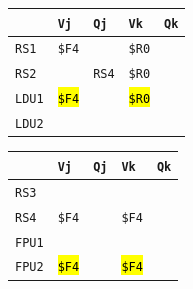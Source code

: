 \begin{enumerate}
    \begin{minipage}{0.45\textwidth}
        \centering
        \begin{tabular}{@{} l | l l l l @{}}
            \toprule
                & \texttt{Vj} & \texttt{Qj} & \texttt{Vk} & \texttt{Qk} \\
            \midrule
            \texttt{RS1} & \texttt{\$F4} & & \texttt{\$R0} & \\ [.3em]
            \texttt{RS2} & & \texttt{RS4} & \texttt{\$R0} & \\
            \cmidrule{1-5}
            \texttt{LDU1} & \hl{\texttt{\$F4}} & & \hl{\texttt{\$R0}} & \\ [.3em]
            \texttt{LDU2} & & & & \\
            \bottomrule
        \end{tabular}
    \end{minipage}
    \hfill
    \begin{minipage}{0.45\textwidth}
        \centering
        \begin{tabular}{@{} l | l l l l @{}}
            \toprule
            & \texttt{Vj} & \texttt{Qj} & \texttt{Vk} & \texttt{Qk} \\
            \midrule
            \texttt{RS3} & & & & \\ [.3em]
            \texttt{RS4} & \texttt{\$F4} & & \texttt{\$F4} & \\
            \cmidrule{1-5}
            \texttt{FPU1} & & & & \\ [.3em]
            \texttt{FPU2} & \hl{\texttt{\$F4}} & & \hl{\texttt{\$F4}} & \\
            \bottomrule
        \end{tabular}
    \end{minipage}


\end{enumerate}
